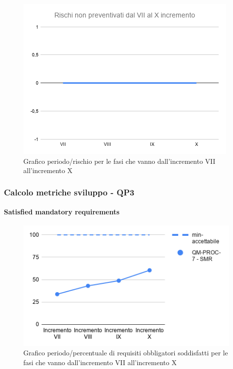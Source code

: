 	\begin{figure}[H]
			\centering
			\includegraphics[width=0.8\linewidth]{./res/images/RischiNonPreven_4.png}
			\caption{Grafico periodo/rischio per le fasi che vanno dall'incremento VII all'incremento X}
			\label{fig:Grafico periodo/rischio per le fasi che vanno dall'incremento VII all'incremento X}
	\end{figure}

\subsubsection{Calcolo metriche sviluppo - QP3}
\paragraph{Satisfied mandatory requirements}
	\begin{figure}[H]
			\centering
			\includegraphics[width=0.8\linewidth]{./res/images/QM-PROC-7-SMR.png}
			\caption{Grafico periodo/percentuale di requisiti obbligatori soddisfatti per le fasi che vanno dall'incremento VII all'incremento X}
			\label{fig:Grafico periodo/percentuale di requisiti obbligatori soddisfatti per le fasi che vanno dall'incremento VII all'incremento X}
	\end{figure}
